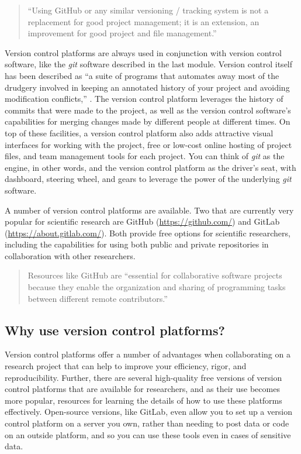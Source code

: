 \documentclass[]{tufte-book}
\begin{document}
\begin{quote}
``Using GitHub or any similar versioning / tracking system is not a replacement
for good project management; it is an extension, an improvement for good
project and file management.'' \citep{perez2016ten}
\end{quote}

Version control platforms are always used in conjunction with version control
software, like the \emph{git} software described in the last module. Version control
itself has been described as ``a suite of programs that automates away most of
the drudgery involved in keeping an annotated history of your project and
avoiding modification conflicts,'' \citep{raymond2003art}. The version control
platform leverages the history of commits that were made to the project, as well
as the version control software's capabilities for merging changes made by
different people at different times. On top of these facilities, a version
control platform also adds attractive visual interfaces for working with the
project, free or low-cost online hosting of project files, and team management
tools for each project. You can think of \emph{git} as the engine, in other words,
and the version control platform as the driver's seat, with dashboard, steering
wheel, and gears to leverage the power of the underlying \emph{git} software.

A number of version control platforms are available. Two that are currently very
popular for scientific research are GitHub (\url{https://github.com/}) and GitLab
(\url{https://about.gitlab.com/}). Both provide free options for scientific
researchers, including the capabilities for using both public and private
repositories in collaboration with other researchers.

\begin{quote}
Resources like GitHub are ``essential for collaborative software projects
because they enable the organization and sharing of programming tasks between
different remote contributors.'' \citep{perez2016ten}
\end{quote}

\hypertarget{why-use-version-control-platforms}{%
\subsection{Why use version control platforms?}\label{why-use-version-control-platforms}}

Version control platforms offer a number of advantages when collaborating
on a research project that can help to improve your efficiency, rigor, and
reproducibility. Further, there are several high-quality free versions
of version control platforms that are available for researchers, and as
their use becomes more popular, resources for learning the details of how
to use these platforms effectively. Open-source versions, like GitLab,
even allow you to set up a version control platform on a server you own,
rather than needing to post data or code on an outside platform, and so
you can use these tools even in cases of sensitive data.
\end{document}
